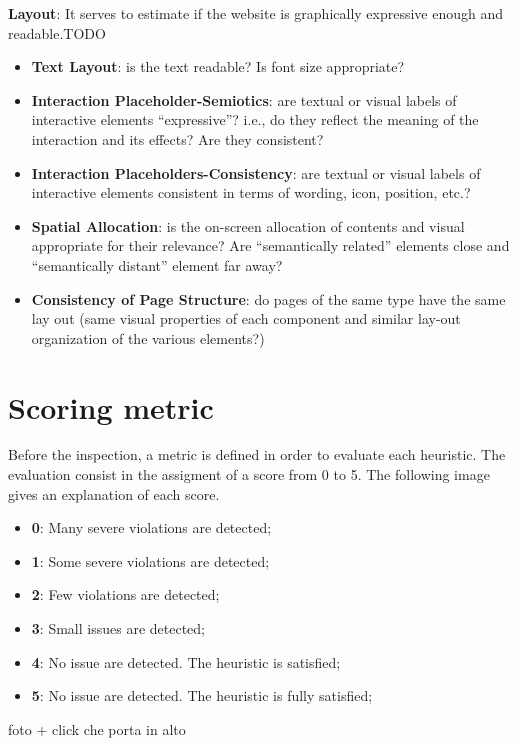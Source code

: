 \textbf{Layout}: It serves to estimate if the website is graphically expressive enough and readable.TODO
\begin{itemize}
\item \textbf{Text Layout}: is the text readable? Is font size appropriate?
\item \textbf{Interaction Placeholder-Semiotics}: are textual or visual labels of interactive elements “expressive”? i.e., do they reflect the meaning of the interaction and its effects? Are they consistent?
\item \textbf{Interaction Placeholders-Consistency}: are textual or visual labels of interactive elements consistent in terms of wording, icon, position, etc.?
\item \textbf{Spatial Allocation}: is the on-screen allocation of contents and visual appropriate for their relevance? Are “semantically related” elements close and “semantically distant” element far away?
\item \textbf{Consistency of Page Structure}: do pages of the same type have the same lay out (same visual properties of each component and similar lay-out organization of the various elements?)
\end{itemize} 


\section{Scoring metric}
Before the inspection, a metric is defined in order to evaluate each heuristic. The evaluation consist in the assigment of a score from 0 to 5. The following image gives an explanation of each score.

\begin{itemize}
\item \textbf{0}: Many severe violations are detected;
\item \textbf{1}: Some severe violations are detected;
\item \textbf{2}: Few violations are detected;
\item \textbf{3}: Small issues are detected;
\item \textbf{4}: No issue are detected. The heuristic is satisfied;
\item \textbf{5}: No issue are detected. The heuristic is fully satisfied; 
\end{itemize}


foto + click che porta in alto